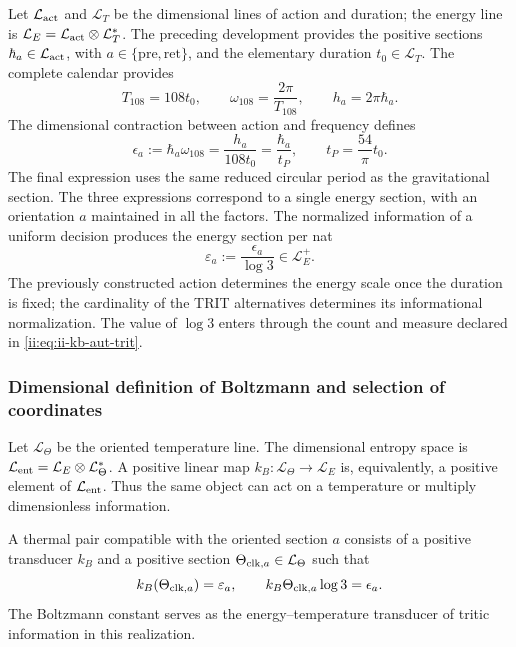 Let \(\mathcal L_{\rm act}\) and \(\mathcal L_T\) be the dimensional
lines of action and duration; the energy line is
\(\mathcal L_E=\mathcal L_{\rm act}\otimes\mathcal L_T^*\).
The preceding development provides the positive sections
\(\hbar_a\in\mathcal L_{\rm act}\), with
\(a\in\{\mathrm{pre},\mathrm{ret}\}\), and the elementary duration
\(t_0\in\mathcal L_T\). The complete calendar provides
\[
 T_{108}=108t_0,\qquad
 \omega_{108}=\frac{2\pi}{T_{108}},\qquad
 h_a=2\pi\hbar_a.
\]
The dimensional contraction between action and frequency defines
\begin{equation}
 \epsilon_a:=\hbar_a\omega_{108}
 =\frac{h_a}{108t_0}
 =\frac{\hbar_a}{t_P},\qquad
 t_P=\frac{54}{\pi}t_0.
 \label{ii:eq:ii-kb-aut-energia}
\end{equation}
The final expression uses the same reduced circular period as the
gravitational section. The three expressions correspond to a single
energy section, with an orientation \(a\) maintained in all
the factors. The normalized information of a uniform decision
produces the energy section per nat
\begin{equation}
 \varepsilon_a:=\frac{\epsilon_a}{\log3}\in\mathcal L_E^+.
 \label{ii:eq:ii-kb-aut-energia-nat}
\end{equation}
The previously constructed action determines the energy scale once
the duration is fixed; the cardinality of the TRIT alternatives determines its
informational normalization. The value of \(\log3\) enters through the
count and measure declared in \eqref{ii:eq:ii-kb-aut-trit}.

\subsubsection{Dimensional definition of Boltzmann and selection of coordinates}

Let \(\mathcal L_\Theta\) be the oriented temperature line.
The dimensional entropy space is
\(\mathcal L_{\rm ent}=\mathcal L_E\otimes\mathcal L_\Theta^*\).
A positive linear map
\(k_B:\mathcal L_\Theta\to\mathcal L_E\) is, equivalently,
a positive element of \(\mathcal L_{\rm ent}\). Thus the same
object can act on a temperature or multiply dimensionless
information.

\begin{definition}
A thermal pair compatible with the oriented section \(a\) consists of
a positive transducer \(k_B\) and a positive section
\(\Theta_{{\rm clk},a}\in\mathcal L_\Theta\) such that
\begin{equation}
 k_B(\Theta_{{\rm clk},a})=\varepsilon_a,
 \qquad
 k_B\Theta_{{\rm clk},a}\log3=\epsilon_a.
 \label{ii:eq:ii-kb-aut-par-termico}
\end{equation}
The Boltzmann constant serves as the energy--temperature
transducer of tritic information in this realization.
\end{definition}

